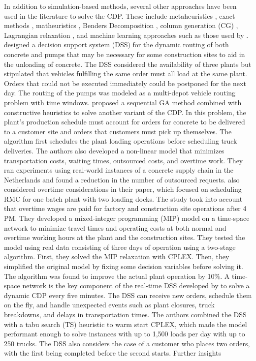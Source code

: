 In addition to simulation-based methods, several other approaches have been used in the literature to solve the CDP. These include metaheuristics \citep{faria2006distributed, misir2011selection, maghrebi2016sequential, yang2022concrete}, exact methods \citep{yan2007optimal, asbach2009analysis, kinable2014concrete}, matheuristics \citep{schmid2009hybrid, schmid2010hybridization}, Benders Decomposition \citep{maghrebi2014benders}, column generation (CG) \citep{maghrebi2014solving, maghrebi2016column}, Lagrangian relaxation \citep{narayanan2015using}, and machine learning approaches such as those used by \cite{graham2006modeling, maghrebi2014exploring, maghrebi2016matching}. \cite{matsatsinis2004towards} designed a decision support system (DSS) for the dynamic routing of both concrete and pumps that may be necessary for some construction sites to aid in the unloading of concrete. The DSS considered the availability of three plants but stipulated that vehicles fulfilling the same order must all load at the same plant. Orders that could not be executed immediately could be postponed for the next day. The routing of the pumps was modeled as a multi-depot vehicle routing problem with time windows. \cite{naso2007genetic} proposed a sequential GA method combined with constructive heuristics to solve another variant of the CDP. In this problem, the plant's production schedule must account for orders for concrete to be delivered to a customer site and orders that customers must pick up themselves. The algorithm first schedules the plant loading operations before scheduling truck deliveries. The authors also developed a non-linear model that minimizes transportation costs, waiting times, outsourced costs, and overtime work. They ran experiments using real-world instances of a concrete supply chain in the Netherlands and found a reduction in the number of outsourced requests. \cite{yan2007optimal} also considered overtime considerations in their paper, which focused on scheduling RMC for one batch plant with two loading docks. The study took into account that overtime wages are paid for factory and construction site operations after 4 PM. They developed a mixed-integer programming (MIP) model on a time-space network to minimize travel times and operating costs at both normal and overtime working hours at the plant and the construction sites. They tested the model using real data consisting of three days of operation using a two-stage algorithm. First, they solved the MIP relaxation with CPLEX. Then, they simplified the original model by fixing some decision variables before solving it. The algorithm was found to improve the actual plant operation by 10\%. A time-space network is the key component of the real-time DSS developed by \cite{durbin2008or} to solve a dynamic CDP every five minutes. The DSS can receive new orders, schedule them on the fly, and handle unexpected events such as plant closures, truck breakdowns, and delays in transportation times. The authors combined the DSS with a tabu search (TS) heuristic to warm start CPLEX, which made the model performant enough to solve instances with up to 1,500 loads per day with up to 250 trucks. The DSS also considers the case of a customer who places two orders, with the first being completed before the second starts. Further insights 